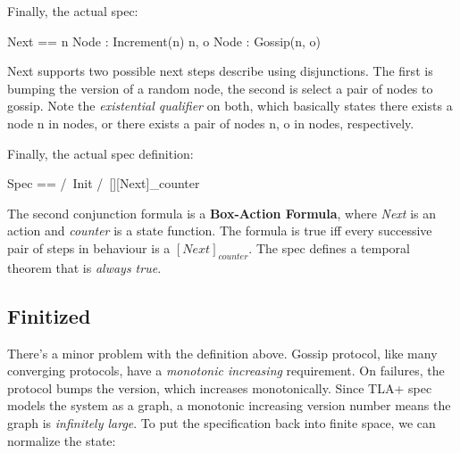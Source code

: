 \documentclass{report}
\begin{document}
Finally, the actual spec: 
\begin{tla}
    Next == \/ \E n \in Node : Increment(n)
            \/ \E n, o \in Node : Gossip(n, o)
\end{tla}
\begin{tlatex}
%
\end{tlatex}

Next supports two possible next steps describe using disjunctions. The first is
bumping the version of a random node, the second is select a pair of nodes to
gossip. Note the \textit{existential qualifier} on both, which basically states
there exists a node n in nodes, or there exists a pair of nodes n, o in nodes,
respectively.\newline

Finally, the actual spec definition:
\begin{tla}
    Spec == /\ Init
            /\ [][Next]_counter  
\end{tla}
\begin{tlatex}
%
%
\end{tlatex}

The second conjunction formula is a \textbf{Box-Action Formula}, where
\textit{Next} is an action and \textit{counter} is a state function. The formula
is true iff every successive pair of steps in behaviour is a $[Next]_{counter}$.
The spec defines a temporal theorem that is \textit{always true}. 

\subsection{Finitized}

There's a minor problem with the definition above. Gossip protocol, like many
converging protocols, have a \textit{monotonic increasing} requirement. On
failures, the protocol bumps the version, which increases monotonically. Since
TLA+ spec models the system as a graph, a monotonic increasing version number
means the graph is \textit{infinitely large}. To put the specification back into
finite space, we can normalize the state:\newline
\end{document}
